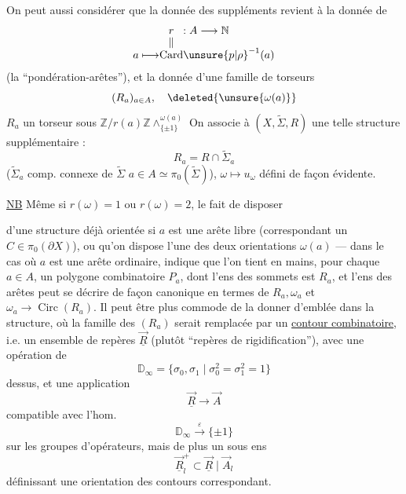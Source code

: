 On peut aussi considérer que la donnée des suppléments revient à la donnée de
\[
 \begin{array}{r@{}c@{}l}
 &r&:A\longrightarrow\mathbb N\\[-.3ex]
 &\Vert&\\[-.3ex]
 a\longmapsto&\operatorname{Card}&\unsure{p|\rho}^{-1}(a)
 \end{array}
\]
(la ``pondération-arêtes''), et la donnée d'une famille de torseurs
\[
 (R_a)_{a\in A},\quad \deleted{\unsure{\omega(a)}}
\]
$R_a$ un torseur sous $\mathbb Z/r(a)\mathbb Z\mathbin{\wedge}^{\omega(a)}_{\{\pm1\}}$
On associe à $(X,\widetilde\Sigma,R)$ une telle structure supplémentaire :
\[
 R_a=R\cap\widetilde\Sigma_a
\]
($\widetilde\Sigma_a$  comp. connexe de $\widetilde\Sigma$   $a\in A\simeq\pi_0(\widetilde\Sigma)$),
 
$\omega\longmapsto u_\omega$ défini de façon évidente.

\uline{NB} Même si $r(\omega)=1$ ou $r(\omega)=2$, le fait de disposer

d'une structure déjà orientée si $a$ est une arête libre
(correspondant  un $C\in\pi_0(\partial X)$), ou qu'on dispose
 l'une des deux orientations $\omega(a)$ ---
dans le cas où $a$ est une arête ordinaire, indique que l'on tient en mains,
pour chaque $a\in A$, un polygone combinatoire $P_a$, dont l'ens des sommets
est $R_a$, et l'ens des arêtes peut se décrire 
de façon canonique en termes de $R_a,\omega_a$ et
$\omega_a\longrightarrow\operatorname{Circ}(R_a)$.
Il peut être plus commode de la donner d'emblée dans la structure,
où la famille des $(R_a)$ serait remplacée par un
\uline{contour combinatoire}, i.e. un ensemble de repères
$\vec{\underline R}$ (plutôt ``repères de rigidification''), avec une opération de
\[
 \mathbb D_\infty=\{\sigma_0,\sigma_1\mid\sigma_0^2=\sigma_1^2=1\}
\]
dessus, et une application
\[
 \vec{\underline R}\longrightarrow\vec A
\]
compatible avec l'hom.
\[
 \mathbb D_\infty\xrightarrow{\varepsilon}\{\pm1\}
\]
sur les groupes d'opérateurs, mais de plus un sous ens
\[
 \vec{\underline R}_l^+\subset\vec{\underline R}\mid\vec A_l
\]
définissant une orientation des contours correspondant.

